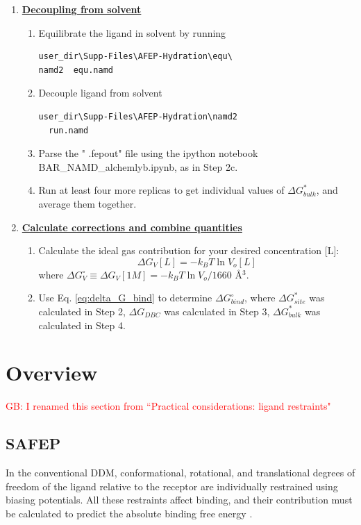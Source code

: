 \documentclass[9pt,tutorial]{livecoms}
\newcommand{\grace}[1]{\textcolor{red}{GB: #1}}
\begin{document}
\begin{enumerate}[left=0pt .. \parindent]
\begin{enumerate}
\end{enumerate}
\item  {\bf \hyperref[sec:11]{Decoupling from solvent}}
\begin{enumerate}
\item Equilibrate the ligand in solvent by running
\begin{verbatim}
user_dir\Supp-Files\AFEP-Hydration\equ\
namd2  equ.namd
\end{verbatim}
\item Decouple ligand from solvent
\begin{verbatim}
user_dir\Supp-Files\AFEP-Hydration\namd2
  run.namd
\end{verbatim}
\item Parse the " .fepout" file using the ipython notebook BAR\_NAMD\_alchemlyb.ipynb, as in Step 2c. 
\item Run at least four more replicas to get individual values of $\Delta G^*_{bulk}$, and average them together. 
\end{enumerate}
\item {\bf \hyperref[sec:12]{Calculate corrections and combine  quantities}}
\begin{enumerate}
\item Calculate the ideal gas contribution for your desired concentration [L]:
$$\Delta G_V[L]=-k_B T\ln V_o[L]$$
where $\Delta G_V^\circ \equiv \Delta G_V[1M] = -k_B T\ln V_o/1660$ \AA$^3$.  
\item Use Eq. \ref{eq:delta_G_bind}  to determine $\Delta G_{bind}^\circ$, where $\Delta G^*_{site}$ was calculated in Step 2, $\Delta G_{DBC}$ was calculated in Step 3, $\Delta G^*_{bulk}$ was calculated in Step 4.
\end{enumerate}
\end{enumerate}
\section{Overview}
\grace{I renamed this section from ``Practical considerations: ligand restraints"} 
\subsection{SAFEP}
In the conventional DDM, conformational, rotational, and translational degrees of freedom of the ligand relative to the receptor are individually restrained using biasing potentials.
All these restraints affect binding, and their contribution must be calculated to predict the absolute binding free energy \cite{Hermans1997, Gilson1997, Boresch2003, Hamelberg2004, Woo2005, Deng2006}.
\end{document}
